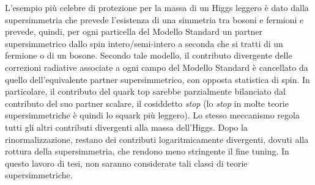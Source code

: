 \medskip
L'esempio più celebre di protezione per la massa di un Higgs leggero è dato dalla supersimmetria che prevede l'esistenza di una 
simmetria tra bosoni e fermioni e prevede, quindi, per ogni particella del Modello Standard un partner supersimmetrico dallo spin intero/semi-intero 
a seconda che si tratti di un fermione o di un bosone.
Secondo tale modello, il contributo divergente delle correzioni radiative associate a ogni campo del Modello Standard è
cancellato da quello dell'equivalente partner supersimmetrico, con opposta statistica di spin.
\newline
In particolare, il contributo del quark top sarebbe parzialmente bilanciato dal contributo del suo partner scalare, 
il cosiddetto \textit{stop} (lo \textit{stop} in molte teorie supersimmetriche è quindi lo squark più leggero).
Lo stesso meccanismo regola tutti gli altri contributi divergenti alla massa dell'Higgs. Dopo la rinormalizzazione, restano dei contributi 
logaritmicamente divergenti, dovuti alla rottura della supersimmetria, che rendono meno stringente il fine tuning.
\newline
In questo lavoro di tesi, non saranno considerate tali classi di teorie supersimmetriche.

